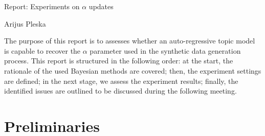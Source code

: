 \documentclass[12pt]{article}
\begin{document}
\begingroup  
  \centering
  \large Report: Experiments on $\alpha$ updates \par
  \large Arijus Pleska \par
\endgroup

\par The purpose of this report is to assesses whether an auto-regressive topic model is capable to recover the $\alpha$ parameter used in the synthetic data generation process. This report is structured in the following order: at the start, the rationale of the used Bayesian methods are covered; then, the experiment settings are defined; in the next stage, we assess the experiment results; finally, the identified issues are outlined to be discussed during the following meeting.

\section*{Preliminaries}
\end{document}
